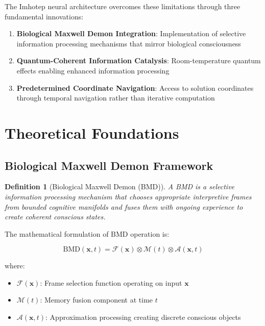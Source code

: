 \documentclass[12pt,a4paper]{article}
\newtheorem{definition}[theorem]{Definition}
\theoremstyle{remark}
\begin{document}
The Imhotep neural architecture overcomes these limitations through three fundamental innovations:

\begin{enumerate}
\item \textbf{Biological Maxwell Demon Integration}: Implementation of selective information processing mechanisms that mirror biological consciousness
\item \textbf{Quantum-Coherent Information Catalysis}: Room-temperature quantum effects enabling enhanced information processing
\item \textbf{Predetermined Coordinate Navigation}: Access to solution coordinates through temporal navigation rather than iterative computation
\end{enumerate}

\section{Theoretical Foundations}

\subsection{Biological Maxwell Demon Framework}

\begin{definition}[Biological Maxwell Demon (BMD)]
A BMD is a selective information processing mechanism that chooses appropriate interpretive frames from bounded cognitive manifolds and fuses them with ongoing experience to create coherent conscious states.
\end{definition}

The mathematical formulation of BMD operation is:

\begin{equation}
\text{BMD}(\mathbf{x}, t) = \mathcal{F}(\mathbf{x}) \otimes \mathcal{M}(t) \otimes \mathcal{A}(\mathbf{x}, t)
\end{equation}

where:
\begin{itemize}
\item $\mathcal{F}(\mathbf{x})$: Frame selection function operating on input $\mathbf{x}$
\item $\mathcal{M}(t)$: Memory fusion component at time $t$
\item $\mathcal{A}(\mathbf{x}, t)$: Approximation processing creating discrete conscious objects
\end{itemize}
\end{document}

